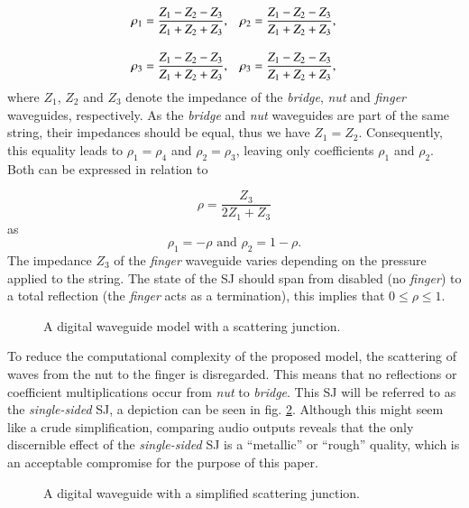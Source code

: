 \documentclass{sigchi}
\begin{document}
\begin{align} \label{eq:rhoCoeff}
	\rho_1 & = \frac{Z_1-Z_2-Z_3}{Z_1+Z_2+Z_3},       &
	\rho_2 & = \frac{Z_1-Z_2-Z_3}{Z_1+Z_2+Z_3},\notag   \\[1em]
	\rho_3 & = \frac{Z_1-Z_2-Z_3}{Z_1+Z_2+Z_3},       &
	\rho_3 & = \frac{Z_1-Z_2-Z_3}{Z_1+Z_2+Z_3},
\end{align}
where $Z_1$, $Z_2$ and $Z_3$ denote the impedance of the \textit{bridge}, \textit{nut} and \textit{finger} waveguides, respectively.
As the \textit{bridge} and \textit{nut} waveguides are part of the same string, their impedances should be equal, thus we have $Z_1=Z_2$.
Consequently, this equality leads to $\rho_1=\rho_4$ and $\rho_2=\rho_3$, leaving only coefficients $\rho_1$ and $\rho_2$.
Both can be expressed in relation to

\begin{equation} \label{eq:rho}
	\rho=\frac{Z_3}{2Z_1+Z_3}
\end{equation}
as
\begin{equation}
	\rho_1=-\rho \text{ and } \rho_2=1-\rho.
\end{equation}
The impedance $Z_3$ of the \textit{finger} waveguide varies depending on the pressure applied to the string.
The state of the SJ should span from disabled (no \textit{finger}) to a total reflection (the \textit{finger} acts as a termination), this implies that $0 \leq \rho \leq 1$.

\begin{figure}[h]
	\centering
	\scalebox{0.56}{}
	\caption{A digital waveguide model with a scattering junction.}
	\label{fig:waveguide_sj}
\end{figure}

To reduce the computational complexity of the proposed model, the scattering of waves from the nut to the finger is disregarded.
This means that no reflections or coefficient multiplications occur from \textit{nut} to \textit{bridge}.
This SJ will be referred to as the \textit{single-sided} SJ, a depiction can be seen in fig. \ref{fig:waveguide_simple_sj}.
Although this might seem like a crude simplification, comparing audio outputs reveals that the only discernible effect of the \textit{single-sided} SJ is a ``metallic'' or ``rough'' quality, which is an acceptable compromise for the purpose of this paper.
\begin{figure}[h]
	\centering
	\scalebox{0.6}{}
	\caption{A digital waveguide with a simplified scattering junction.}
	\label{fig:waveguide_simple_sj}
\end{figure}
\end{document}
